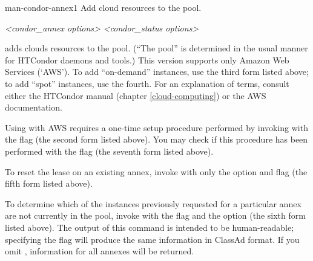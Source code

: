 \begin{ManPage}{}{man-condor-annex}{1}
{Add cloud resources to the pool.}

\Synopsis

 

  

 

 



 

 \emph{<condor\_annex options>}  \emph{<condor\_status options>}

\Description

 adds clouds resources to the pool.  (``The pool'' is determined
in the usual manner for HTCondor daemons and tools.)  This version supports
only Amazon Web Services (`AWS').  To add ``on-demand'' instances, use
the third form listed above; to add ``spot'' instances, use the fourth.  For an
explanation of terms, consult either the HTCondor manual
(chapter \ref{cloud-computing}) or the AWS documentation.

Using  with AWS requires a one-time setup procedure
performed by invoking  with the  flag
(the second form listed above).  You may check if this procedure has been
performed with the  flag (the seventh form listed above).

To reset the lease on an existing annex, invoke  with
only the  option and  flag (the fifth form
listed above).

To determine which of the instances previously requested for a
particular annex are not currently in the pool, invoke 
with the  flag and the  option (the sixth
form listed above).  The output of this command is intended to be
human-readable; specifying the  flag will produce the
same information in ClassAd format.  If you omit ,
information for all annexes will be returned.


\end{ManPage}

